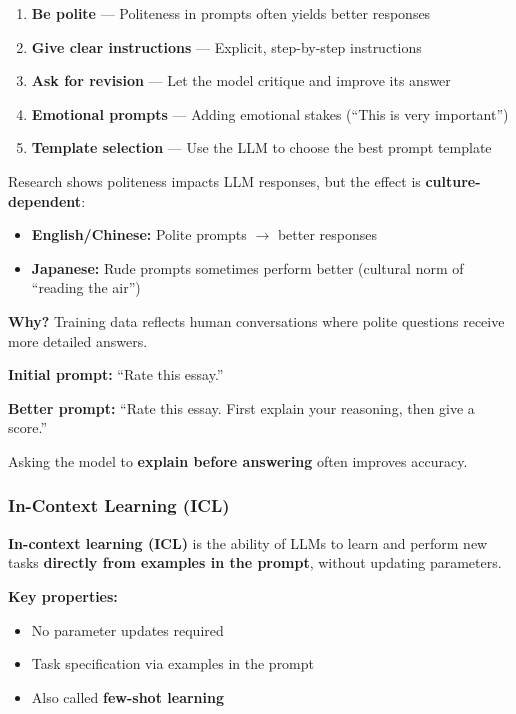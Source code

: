 \begin{thmbox}
\begin{enumerate}
  \item \textbf{Be polite} --- Politeness in prompts often yields better responses
  \item \textbf{Give clear instructions} --- Explicit, step-by-step instructions
  \item \textbf{Ask for revision} --- Let the model critique and improve its answer
  \item \textbf{Emotional prompts} --- Adding emotional stakes (``This is very important'')
  \item \textbf{Template selection} --- Use the LLM to choose the best prompt template
\end{enumerate}
\end{thmbox}

\begin{exbox}
Research shows politeness impacts LLM responses, but the effect is \textbf{culture-dependent}:
\begin{itemize}
  \item \textbf{English/Chinese:} Polite prompts $\to$ better responses
  \item \textbf{Japanese:} Rude prompts sometimes perform better (cultural norm of ``reading the air'')
\end{itemize}

\textbf{Why?} Training data reflects human conversations where polite questions receive more detailed answers.
\end{exbox}

\begin{exbox}
\textbf{Initial prompt:} ``Rate this essay.''

\textbf{Better prompt:} ``Rate this essay. First explain your reasoning, then give a score.''

Asking the model to \textbf{explain before answering} often improves accuracy.
\end{exbox}

\bigseparator

\subsubsection{In-Context Learning (ICL)}

\begin{defbox}
\textbf{In-context learning (ICL)} is the ability of LLMs to learn and perform new tasks \textbf{directly from examples in the prompt}, without updating parameters.

\textbf{Key properties:}
\begin{itemize}
  \item No parameter updates required
  \item Task specification via examples in the prompt
  \item Also called \textbf{few-shot learning}
\end{itemize}
\end{defbox}

